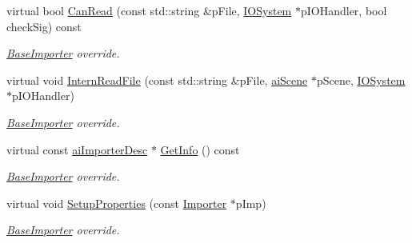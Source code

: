 \begin{DoxyCompactItemize}
\item 
virtual bool \hyperlink{class_assimp_1_1_ogre_1_1_ogre_importer_a9b6609a0b257464d9a1092adf430ebef}{Can\+Read} (const std\+::string \&p\+File, \hyperlink{class_assimp_1_1_i_o_system}{I\+O\+System} $\ast$p\+I\+O\+Handler, bool check\+Sig) const 
\begin{DoxyCompactList}\small\item\em \hyperlink{class_assimp_1_1_base_importer}{Base\+Importer} override. \end{DoxyCompactList}\item 
virtual void \hyperlink{class_assimp_1_1_ogre_1_1_ogre_importer_af87c48299e8d92cd87d424b6ef71795b}{Intern\+Read\+File} (const std\+::string \&p\+File, \hyperlink{structai_scene}{ai\+Scene} $\ast$p\+Scene, \hyperlink{class_assimp_1_1_i_o_system}{I\+O\+System} $\ast$p\+I\+O\+Handler)
\begin{DoxyCompactList}\small\item\em \hyperlink{class_assimp_1_1_base_importer}{Base\+Importer} override. \end{DoxyCompactList}\item 
\hypertarget{class_assimp_1_1_ogre_1_1_ogre_importer_ab7c09bcd61d6bebd1738439100a4c3a0}{virtual const \hyperlink{structai_importer_desc}{ai\+Importer\+Desc} $\ast$ \hyperlink{class_assimp_1_1_ogre_1_1_ogre_importer_ab7c09bcd61d6bebd1738439100a4c3a0}{Get\+Info} () const }\label{class_assimp_1_1_ogre_1_1_ogre_importer_ab7c09bcd61d6bebd1738439100a4c3a0}

\begin{DoxyCompactList}\small\item\em \hyperlink{class_assimp_1_1_base_importer}{Base\+Importer} override. \end{DoxyCompactList}\item 
\hypertarget{class_assimp_1_1_ogre_1_1_ogre_importer_a766a089f91a75d1c32fcdf2f21e0d464}{virtual void \hyperlink{class_assimp_1_1_ogre_1_1_ogre_importer_a766a089f91a75d1c32fcdf2f21e0d464}{Setup\+Properties} (const \hyperlink{class_assimp_1_1_importer}{Importer} $\ast$p\+Imp)}\label{class_assimp_1_1_ogre_1_1_ogre_importer_a766a089f91a75d1c32fcdf2f21e0d464}

\begin{DoxyCompactList}\small\item\em \hyperlink{class_assimp_1_1_base_importer}{Base\+Importer} override. \end{DoxyCompactList}\end{DoxyCompactItemize}

